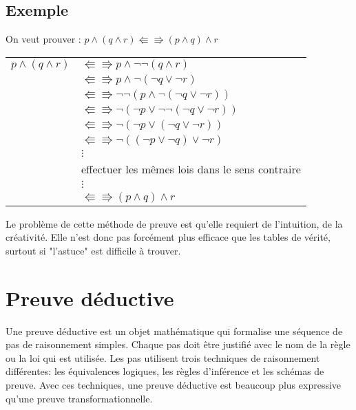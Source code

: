 			
			\subsection*{Exemple}
			On veut prouver : $p \land (q \land r) \Lleftarrow \Rrightarrow (p \land q) \land r$
			\begin{center}
			\begin{tabular}{ll}
			
			$p \land (q \land r)$ & $\Lleftarrow \Rrightarrow p \land \lnot \lnot (q \land r)$\\
			& $\Lleftarrow \Rrightarrow p \land \lnot (\lnot q \lor \lnot r)$\\
			& $\Lleftarrow \Rrightarrow \lnot \lnot (p \land \lnot (\lnot q \lor \lnot r))$\\
			& $\Lleftarrow \Rrightarrow \lnot (\lnot p \lor \lnot \lnot (\lnot q \lor \lnot r))$\\
			& $\Lleftarrow \Rrightarrow \lnot (\lnot p \lor (\lnot q \lor \lnot r))$\\
			& $\Lleftarrow \Rrightarrow \lnot ((\lnot p \lor \lnot q) \lor \lnot r)$\\
			&$\vdots$\\
			& effectuer les mêmes lois dans le sens contraire \\
			&$\vdots$\\
			& $\Lleftarrow \Rrightarrow (p \land q) \land r$\\
			\end{tabular}
			\end{center}
Le problème de cette méthode de preuve est qu'elle requiert de l'intuition, de la créativité. Elle n'est donc pas forcément plus efficace que les tables de vérité, surtout si "l'astuce" est difficile à trouver.
		
\section{Preuve déductive}

Une preuve déductive est un objet mathématique qui formalise une séquence
de pas de raisonnement simples.
Chaque pas doit être justifié avec le nom de la règle ou la loi qui est utilisée.
Les pas utilisent trois techniques de raisonnement différentes:
les équivalences logiques, les règles d'inférence et les schémas de preuve.
Avec ces techniques,
une preuve déductive est beaucoup plus expressive qu'une preuve transformationnelle.

